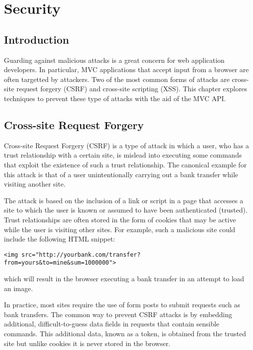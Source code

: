 \chapter{Security}

\section{Introduction}

Guarding against malicious attacks is a great concern for web application developers. In
particular, MVC applications that accept input from a browser are often targetted by 
attackers. Two of the most common forms of attacks are cross-site request forgery (CSRF)
and cross-site scripting (XSS). This chapter explores techniques to prevent these type
of attacks with the aid of the MVC API.

\section{Cross-site Request Forgery}

Cross-site Request Forgery (CSRF) is a type of attack in which a user, who has a trust
relationship with a certain site, is mislead into executing some commands that exploit the
existence of such a trust relationship. The canonical example for this attack is that of
a user unintentionally carrying out a bank transfer while visiting another site. 

The attack is based on the inclusion of a link or script in a page that accesses a site 
to which the user is known or assumed to have been authenticated (trusted). Trust
relationships are often stored in the form of cookies that may be active while the user
is visiting other sites. For example, such a malicious site could include the following
HTML snippet:

\begin{verbatim}
<img src="http://yourbank.com/transfer?from=yours&to=mine&sum=1000000">
\end{verbatim}

which will result in the browser executing a bank transfer in an attempt to load an image.


In practice, most sites require the use of form posts to submit requests such as bank
transfers. The common way to prevent CSRF attacks is by embedding additional, 
difficult-to-guess data fields in requests that contain sensible commands. This 
additional data, known as a token, is obtained from the trusted site but 
unlike cookies it is never stored in the browser.


